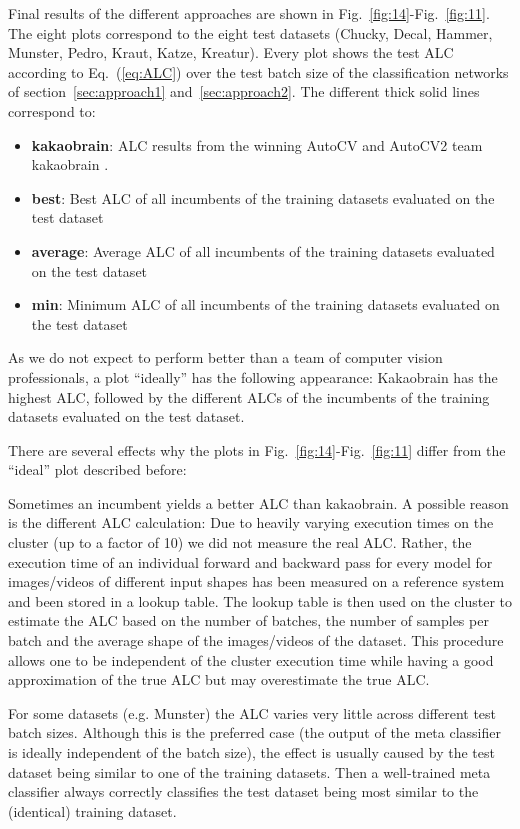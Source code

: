 \documentclass{article}
\begin{document}
Final results of the different approaches are shown in Fig.~\ref{fig:14}-Fig.~\ref{fig:11}. The eight plots correspond to the eight test datasets (Chucky, Decal, Hammer, Munster, Pedro, Kraut, Katze, Kreatur). Every plot shows the test ALC according to Eq.~(\ref{eq:ALC}) over the test batch size of the classification networks of section~\ref{sec:approach1} and~\ref{sec:approach2}. The different thick solid lines correspond to:
\begin{itemize}
\item \textbf{kakaobrain}: ALC results from the winning AutoCV and AutoCV2 team kakaobrain \cite{kakaobrain}.
\item \textbf{best}: Best ALC of all incumbents of the training datasets evaluated on the test dataset
\item \textbf{average}: Average ALC of all incumbents of the training datasets evaluated on the test dataset
\item \textbf{min}: Minimum ALC of all incumbents of the training datasets evaluated on the test dataset
\end{itemize}
As we do not expect to perform better than a team of computer vision professionals, a plot ``ideally'' has the following appearance: Kakaobrain has the highest ALC, followed by the different ALCs of the incumbents of the training datasets evaluated on the test dataset.

There are several effects why the plots in Fig.~\ref{fig:14}-Fig.~\ref{fig:11} differ from the ``ideal'' plot described before: 

Sometimes an incumbent yields a better ALC than kakaobrain. A possible reason is the different ALC calculation: Due to heavily varying execution times on the cluster (up to a factor of 10) we did not measure the real ALC. Rather, the execution time of an individual forward and backward pass for every model for images/videos of different input shapes has been measured on a reference system and been stored in a lookup table. The lookup table is then used on the cluster to estimate the ALC based on the number of batches, the number of samples per batch and the average shape of the images/videos of the dataset. This procedure allows one to be independent of the cluster execution time while having a good approximation of the true ALC but may overestimate the true ALC.

For some datasets (e.g. Munster) the ALC varies very little across different test batch sizes. Although this is the preferred case (the output of the meta classifier is ideally independent of the batch size), the effect is usually caused by the test dataset being similar to one of the training datasets. Then a well-trained meta classifier always correctly classifies the test dataset being most similar to the (identical) training dataset.
\end{document}
